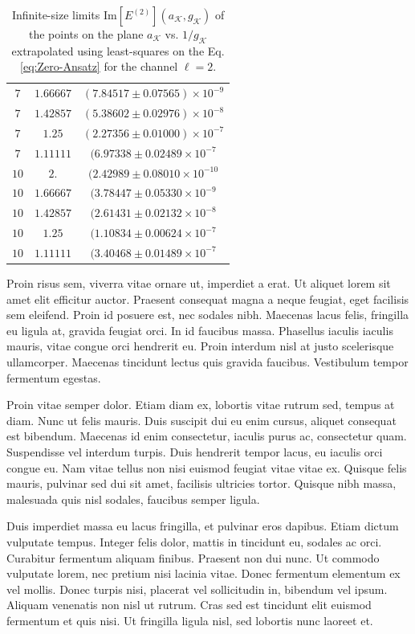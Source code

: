 \documentclass[english,aps,prd,nofootinbib,twocolumn]{revtex4-1}
\begin{document}
\begin{table}
\begin{tabular}{ccc}
    $ 7 $ & $ 1.66667 $ & $ (7.84517\pm 0.07565)\times 10^{-9} $ \\
    $ 7 $ & $ 1.42857 $ & $ (5.38602\pm 0.02976)\times 10^{-8} $ \\
    $ 7 $ & $ 1.25    $ & $ (2.27356\pm 0.01000)\times 10^{-7} $ \\
    $ 7 $ & $ 1.11111 $ & $ (6.97338\pm 0.02489\times 10^{-7} $ \\ \hline \hline  
    $10 $ & $ 2.      $ & $ (2.42989\pm 0.08010\times 10^{-10} $ \\
    $10 $ & $ 1.66667 $ & $ (3.78447\pm 0.05330\times 10^{-9} $ \\
    $10 $ & $ 1.42857 $ & $ (2.61431\pm 0.02132\times 10^{-8} $ \\
    $10 $ & $ 1.25    $ & $ (1.10834\pm 0.00624\times 10^{-7} $ \\
    $10 $ & $ 1.11111 $ & $ (3.40468\pm 0.01489\times 10^{-7} $ \\ \hline \hline  
\end{tabular}
\caption{Infinite-size limits $\mathrm{Im}[E^{(2)}](a_{\mathcal{K}},g_{\mathcal{K}})$ of the points on the plane $a_{\mathcal{K}}$ vs. $1/g_{\mathcal{K}}$ extrapolated using least-squares on the Eq. \eqref{eq:Zero-Ansatz} for the channel $\ell=2$.}
\label{tab:Inf-size-points-L2}
\end{table}


Proin risus sem, viverra vitae ornare ut, imperdiet a erat. Ut aliquet lorem sit amet elit efficitur auctor. Praesent consequat magna a neque feugiat, eget facilisis sem eleifend. Proin id posuere est, nec sodales nibh. Maecenas lacus felis, fringilla eu ligula at, gravida feugiat orci. In id faucibus massa. Phasellus iaculis iaculis mauris, vitae congue orci hendrerit eu. Proin interdum nisl at justo scelerisque ullamcorper. Maecenas tincidunt lectus quis gravida faucibus. Vestibulum tempor fermentum egestas.

Proin vitae semper dolor. Etiam diam ex, lobortis vitae rutrum sed, tempus at diam. Nunc ut felis mauris. Duis suscipit dui eu enim cursus, aliquet consequat est bibendum. Maecenas id enim consectetur, iaculis purus ac, consectetur quam. Suspendisse vel interdum turpis. Duis hendrerit tempor lacus, eu iaculis orci congue eu. Nam vitae tellus non nisi euismod feugiat vitae vitae ex. Quisque felis mauris, pulvinar sed dui sit amet, facilisis ultricies tortor. Quisque nibh massa, malesuada quis nisl sodales, faucibus semper ligula.

Duis imperdiet massa eu lacus fringilla, et pulvinar eros dapibus. Etiam dictum vulputate tempus. Integer felis dolor, mattis in tincidunt eu, sodales ac orci. Curabitur fermentum aliquam finibus. Praesent non dui nunc. Ut commodo vulputate lorem, nec pretium nisi lacinia vitae. Donec fermentum elementum ex vel mollis. Donec turpis nisi, placerat vel sollicitudin in, bibendum vel ipsum. Aliquam venenatis non nisl ut rutrum. Cras sed est tincidunt elit euismod fermentum et quis nisi. Ut fringilla ligula nisl, sed lobortis nunc laoreet et.
\end{document}
